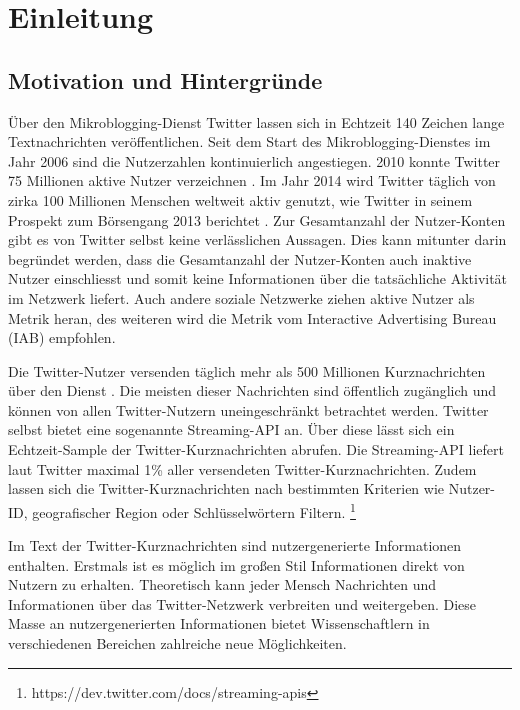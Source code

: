 \chapter{Einleitung}\label{chp:Einleitung}

	\section{Motivation und Hintergründe}

		Über den Mikroblogging-Dienst Twitter lassen sich in Echtzeit 140 Zeichen lange Textnachrichten veröffentlichen.
		Seit dem Start des Mikroblogging-Dienstes im Jahr 2006 sind die Nutzerzahlen kontinuierlich angestiegen.
		2010 konnte Twitter 75 Millionen aktive Nutzer verzeichnen \cite{Cheng2010}.
		Im Jahr 2014 wird Twitter täglich von zirka 100 Millionen Menschen weltweit aktiv genutzt, wie Twitter in seinem Prospekt zum Börsengang 2013 berichtet \cite{twitterinc2013}.  
		Zur Gesamtanzahl der Nutzer-Konten gibt es von Twitter selbst keine verlässlichen Aussagen. 
		Dies kann mitunter darin begründet werden, dass die Gesamtanzahl der Nutzer-Konten auch inaktive Nutzer einschliesst und somit keine Informationen über die tatsächliche Aktivität im Netzwerk liefert. 
		Auch andere soziale Netzwerke ziehen aktive Nutzer als Metrik heran, des weiteren wird die Metrik vom Interactive Advertising Bureau (IAB) empfohlen. \cite{IAB}
		
		Die Twitter-Nutzer versenden täglich mehr als 500 Millionen Kurznachrichten über den Dienst \cite{twitterinc2013}.
		Die meisten dieser Nachrichten sind öffentlich zugänglich und können von allen Twitter-Nutzern uneingeschränkt betrachtet werden. 
		Twitter selbst bietet eine sogenannte Streaming-API an.
		Über diese lässt sich ein Echtzeit-Sample der Twitter-Kurznachrichten abrufen. 
		Die Streaming-API liefert laut Twitter maximal 1\% aller versendeten Twitter-Kurznachrichten.
		Zudem lassen sich die Twitter-Kurznachrichten nach bestimmten Kriterien wie Nutzer-ID, geografischer Region oder Schlüsselwörtern Filtern. \footnote{https://dev.twitter.com/docs/streaming-apis} 

		Im Text der Twitter-Kurznachrichten sind nutzergenerierte Informationen enthalten.  
		Erstmals ist es möglich im großen Stil Informationen direkt von Nutzern zu erhalten. 
		Theoretisch kann jeder Mensch Nachrichten und Informationen über das Twitter-Netzwerk verbreiten und weitergeben. 
		Diese Masse an nutzergenerierten Informationen bietet Wissenschaftlern in verschiedenen Bereichen zahlreiche neue Möglichkeiten.

